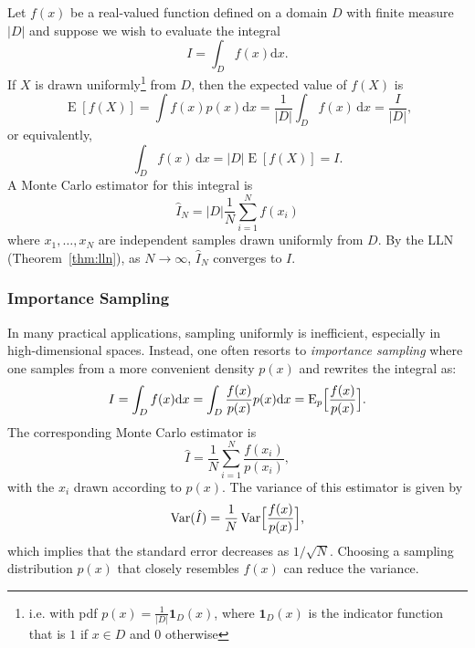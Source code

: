 \documentclass[11pt, headings=standardclasses, parskip=half, twoside]{scrartcl}
\newcommand{\dif}{\mathrm{d}}
\newcommand{\Var}{\operatorname{Var}}
\newcommand{\Exp}{\operatorname{E}}
\begin{document}
Let $f(x)$ be a real-valued function defined on a domain $D$ with finite measure \(|D|\) and suppose we wish to evaluate the integral
\[
I=\int_D f(x) \dif x \text{.}
\]
If $X$ is drawn uniformly\footnote{i.e. with pdf $p(x)=\frac{1}{|D|}\mathbf{1}_{D}(x)$, where $\mathbf{1}_{D}(x)$ is the indicator function that is $1$ if $x \in D$ and $0$ otherwise} from $D$, then the expected value of $f(X)$ is
\[
\operatorname{E}[f(X)]
=\int f(x) p(x) \dif x
=\frac{1}{|D|} \int_{D} f(x) \, \mathrm{d} x 
= \frac{I}{|D|} 
\text{,}
\]
or equivalently,
\[
\int_{D} f(x) \, \mathrm{d} x=|D| \operatorname{E}[f(X)] = I \text{.}
\]
%
A Monte Carlo estimator for this integral is
\[
\boxed{
  \hat{I}_{N}=|D| \frac{1}{N} \sum_{i=1}^{N} f\left(x_{i}\right)
}
\]
where $x_{1}, \ldots, x_{N}$ are independent samples drawn uniformly from $D$.
%
By the LLN (Theorem~\ref{thm:lln}), as \(N\to\infty\), \(\hat{I}_N\) converges to \(I\).



\subsubsection{Importance Sampling}

In many practical applications, sampling uniformly is inefficient, especially in high-dimensional spaces. 
Instead, one often resorts to \emph{importance sampling} where one samples from a more convenient density \(p(x)\) and rewrites the integral as:
\[
I=\int_D f(x)\dif x=\int_D \frac{f(x)}{p(x)}p(x)\dif x=\Exp_{p}\Bigl[\frac{f(x)}{p(x)}\Bigr].
\]
The corresponding Monte Carlo estimator is
\[
\hat{I}=\frac{1}{N}\sum_{i=1}^N \frac{f(x_i)}{p(x_i)},
\]
with the \(x_i\) drawn according to \(p(x)\). The variance of this estimator is given by
\[
\Var(\hat{I})=\frac{1}{N}\Var\Bigl[\frac{f(x)}{p(x)}\Bigr]\text{,}
\]
which implies that the standard error decreases as \(1/\sqrt{N}\).
Choosing a sampling distribution \(p(x)\) that closely resembles \(f(x)\) can reduce the variance.
\end{document}
